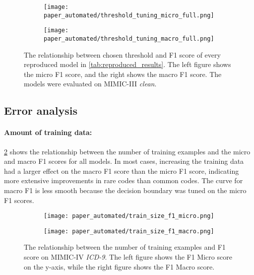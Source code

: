 {\begin{figure}[t]
    \centering
    \begin{subfigure}[b]{0.6\textheight}
        \centering
        \texttt{[image: paper\_automated/threshold\_tuning\_micro\_full.png]}
    \end{subfigure}
    \begin{subfigure}[b]{0.6\textheight}
        \centering
        \texttt{[image: paper\_automated/threshold\_tuning\_macro\_full.png]}
    \end{subfigure}%
    \caption[The relationship between chosen threshold and F1 score of every reproduced model in \cref{tab:reproduced_results}]{The relationship between chosen threshold and F1 score of every reproduced model in \cref{tab:reproduced_results}. The left figure shows the micro F1 score, and the right shows the macro F1 score. The models were evaluated on MIMIC-III \textit{clean}.}
    \label{fig:threshold_tuning}
\end{figure}


\subsection{Error analysis}

\paragraph{Amount of training data:}

\cref{fig:train_size} shows the relationship between the number of training examples and the micro and macro F1 scores for all models.
In most cases, increasing the training data had a larger effect on the macro F1 score than the micro F1 score, indicating more extensive improvements in rare codes than common codes. The curve for macro F1 is less smooth because the decision boundary was tuned on the micro F1 scores.

\begin{figure}[t]
    \centering
    \begin{subfigure}[b]{0.6\textheight}
        \centering
        \texttt{[image: paper\_automated/train\_size\_f1\_micro.png]}
    \end{subfigure}
    \begin{subfigure}[b]{0.6\textheight}
        \centering
        \texttt{[image: paper\_automated/train\_size\_f1\_macro.png]}
    \end{subfigure}
    \caption[The relationship between the number of training examples and F1 score on MIMIC-IV \textit{ICD-9}]{The relationship between the number of training examples and F1 score on MIMIC-IV \textit{ICD-9}. The left figure shows the F1 Micro score on the y-axis, while the right figure shows the F1 Macro score.}
    \label{fig:train_size}
\end{figure}


}

